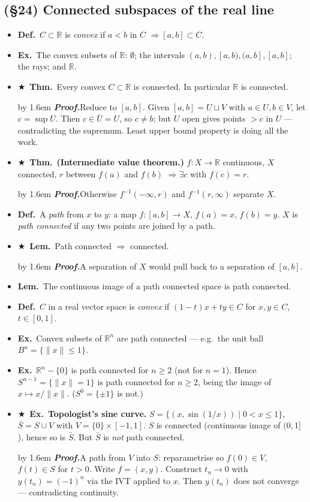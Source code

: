 \documentclass[12pt,a4paper]{article}
\newcommand{\Dfn}{\textbf{Def.}~}
\newcommand{\Thm}{\textbf{Thm.}~}
\newcommand{\Lem}{\textbf{Lem.}~}
\newcommand{\Exa}{\textbf{Ex.}~}
\newcommand{\Key}{$\bigstar$~}                  %
\newcommand{\Pf}[1]{%
  \par\addvspace{7pt}\nopagebreak
  \begingroup
    \advance\leftskip by 1.6em
    \parindent=0pt \small\color{prf}%
    \textbf{\textit{Proof.}}\enspace #1\par
  \endgroup
  \addvspace{9pt}}
\newenvironment{BL}%
  {\begin{itemize}[leftmargin=1.4em,labelsep=0.55em,itemsep=11pt,topsep=11pt,parsep=0pt]}%
  {\end{itemize}}
\newcommand{\RR}{\mathbb{R}}
\newcommand{\imp}{\Rightarrow}
\begin{document}
\subsection{(\S24) Connected subspaces of the real line}

\begin{BL}
\item \Dfn $C\subset\RR$ is \emph{convex} if $a<b$ in $C$ $\imp[a,b]\subset C$.
\item \Exa The convex subsets of $\RR$: $\emptyset$; the intervals $(a,b),[a,b),(a,b],[a,b]$;
      the rays; and $\RR$.
\item \Key\Thm Every convex $C\subset\RR$ is connected. In particular $\RR$ is connected.
\Pf{Reduce to $[a,b]$. Given $[a,b]=U\sqcup V$ with $a\in U,b\in V$, let $c=\sup U$.
Then $c\in\bar U=U$, so $c\neq b$; but $U$ open gives points $>c$ in $U$ ---
contradicting the supremum. Least upper bound property is doing all the work.}
\item \Key\Thm \textbf{(Intermediate value theorem.)} $f\colon X\to\RR$ continuous,
      $X$ connected, $r$ between $f(a)$ and $f(b)$ $\imp\exists c$ with $f(c)=r$.
\Pf{Otherwise $f^{-1}(-\infty,r)$ and $f^{-1}(r,\infty)$ separate $X$.}
\item \Dfn A \emph{path} from $x$ to $y$: a map $f\colon[a,b]\to X$, $f(a)=x$, $f(b)=y$.
      $X$ is \emph{path connected} if any two points are joined by a path.
\item \Key\Lem Path connected $\imp$ connected.
      \Pf{A separation of $X$ would pull back to a separation of $[a,b]$.}
\item \Lem The continuous image of a path connected space is path connected.
\item \Dfn $C$ in a real vector space is \emph{convex} if $(1-t)x+ty\in C$ for
      $x,y\in C$, $t\in[0,1]$.
\item \Exa Convex subsets of $\RR^n$ are path connected --- e.g.\ the unit ball
      $B^n=\{\|x\|\le1\}$.
\item \Exa $\RR^n-\{0\}$ is path connected for $n\ge2$ (not for $n=1$).
      Hence $S^{n-1}=\{\|x\|=1\}$ is path connected for $n\ge2$, being the image of
      $x\mapsto x/\|x\|$. ($S^0=\{\pm1\}$ is not.)
\item \Key\Exa \textbf{Topologist's sine curve.}
      $S=\{(x,\sin(1/x))\mid 0<x\le1\}$, \; $\bar S=S\cup V$ with $V=\{0\}\times[-1,1]$.
      $S$ is connected (continuous image of $(0,1]$), hence so is $\bar S$.
      But $\bar S$ is \emph{not} path connected.
\Pf{A path from $V$ into $S$: reparametrise so $f(0)\in V$, $f(t)\in S$ for $t>0$.
Write $f=(x,y)$. Construct $t_n\to0$ with $y(t_n)=(-1)^n$ via the IVT applied to $x$.
Then $y(t_n)$ does not converge --- contradicting continuity.}
\end{BL}
\end{document}
